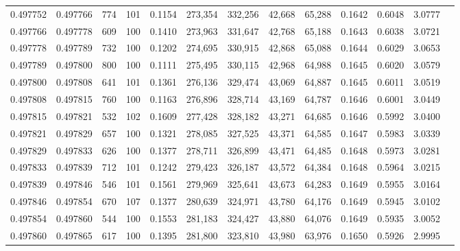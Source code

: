 \begin{tabular}{rrrrrrrrrrrrr}
0.497752 & 0.497766 &   774 & 101 &                                     0.1154 & 273,354 & 332,256 &  42,668 &  65,288 & 0.1642 & 0.6048 & 3.0777 \\
0.497766 & 0.497778 &   609 & 100 &                                     0.1410 & 273,963 & 331,647 &  42,768 &  65,188 & 0.1643 & 0.6038 & 3.0721 \\
0.497778 & 0.497789 &   732 & 100 &                                     0.1202 & 274,695 & 330,915 &  42,868 &  65,088 & 0.1644 & 0.6029 & 3.0653 \\
0.497789 & 0.497800 &   800 & 100 &                                     0.1111 & 275,495 & 330,115 &  42,968 &  64,988 & 0.1645 & 0.6020 & 3.0579 \\
0.497800 & 0.497808 &   641 & 101 &                                     0.1361 & 276,136 & 329,474 &  43,069 &  64,887 & 0.1645 & 0.6011 & 3.0519 \\
0.497808 & 0.497815 &   760 & 100 &                                     0.1163 & 276,896 & 328,714 &  43,169 &  64,787 & 0.1646 & 0.6001 & 3.0449 \\
0.497815 & 0.497821 &   532 & 102 &                                     0.1609 & 277,428 & 328,182 &  43,271 &  64,685 & 0.1646 & 0.5992 & 3.0400 \\
0.497821 & 0.497829 &   657 & 100 &                                     0.1321 & 278,085 & 327,525 &  43,371 &  64,585 & 0.1647 & 0.5983 & 3.0339 \\
0.497829 & 0.497833 &   626 & 100 &                                     0.1377 & 278,711 & 326,899 &  43,471 &  64,485 & 0.1648 & 0.5973 & 3.0281 \\
0.497833 & 0.497839 &   712 & 101 &                                     0.1242 & 279,423 & 326,187 &  43,572 &  64,384 & 0.1648 & 0.5964 & 3.0215 \\
0.497839 & 0.497846 &   546 & 101 &                                     0.1561 & 279,969 & 325,641 &  43,673 &  64,283 & 0.1649 & 0.5955 & 3.0164 \\
0.497846 & 0.497854 &   670 & 107 &                                     0.1377 & 280,639 & 324,971 &  43,780 &  64,176 & 0.1649 & 0.5945 & 3.0102 \\
0.497854 & 0.497860 &   544 & 100 &                                     0.1553 & 281,183 & 324,427 &  43,880 &  64,076 & 0.1649 & 0.5935 & 3.0052 \\
0.497860 & 0.497865 &   617 & 100 &                                     0.1395 & 281,800 & 323,810 &  43,980 &  63,976 & 0.1650 & 0.5926 & 2.9995 \\

\end{tabular}
